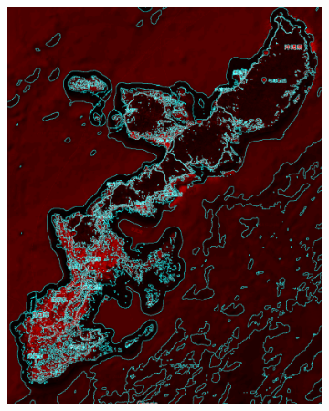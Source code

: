 \begin{figure}
\begin{subfigure}{.25\textwidth}
    \includegraphics[width=\textwidth]{pics/okinawa_lines.png}
    \caption{}
    \label{fig:okinawa_lines}
  \end{subfigure}
  \begin{subfigure}{.25\textwidth}

\end{subfigure}
\end{figure}
